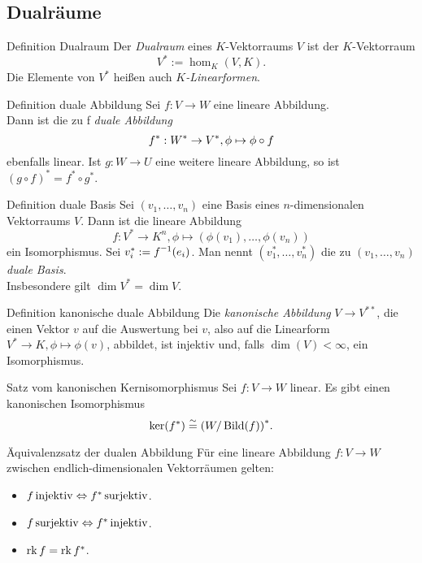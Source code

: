 \documentclass[main.tex]{subfiles}
\begin{document}
\subsection*{Dualräume}
\begin{karte}{Definition Dualraum}
    Der \textit{Dualraum} eines \(K\)-Vektorraums \(V\) ist der 
    \(K\)-Vektorraum 
    \[ V^* := \hom_K(V,K). \]
    Die Elemente von \(V^*\) heißen auch \textit{\(K\)-Linearformen}.
\end{karte}
\begin{karte}{Definition duale Abbildung}
    Sei \( f : V \rightarrow W \) eine lineare Abbildung.\\
    Dann ist die zu f \textit{duale Abbildung}
    \[ f^* : W^* \rightarrow V^*, \phi \mapsto \phi \circ f \]
    ebenfalls linear.
    Ist \(g: W \rightarrow U\) eine weitere lineare Abbildung,
    so ist \({(g \circ f)}^* = f^* \circ g^* \).    
\end{karte}
\begin{karte}{Definition duale Basis}
    Sei \( (v_1, \ldots, v_n) \) eine Basis eines 
    \(n\)-dimensionalen Vektorraums \(V\). Dann ist 
    die lineare Abbildung 
    \[ f : V^* \rightarrow K^n, 
    \phi \mapsto (\phi(v_1), \ldots, \phi(v_n)) \]
    ein Isomorphismus. Sei \( v_i^* := \inverse{f}(e_i) \). 
    Man nennt \( (v_1^*, \ldots, v_n^*) \) die zu 
    \( (v_1, \ldots, v_n) \) \textit{duale Basis}.\\
    Insbesondere gilt \( \dim V^* = \dim V \).
\end{karte}
\begin{karte}{Definition kanonische duale Abbildung}
    Die \textit{kanonische Abbildung} \( V \rightarrow V^{**} \),
    die einen Vektor \(v\) auf die Auswertung bei \(v\), also auf die 
    Linearform \( V^* \rightarrow K, \phi \mapsto \phi(v)\), abbildet,
    ist injektiv und, falls \(\dim(V) < \infty \), ein Isomorphismus.
\end{karte}
\begin{karte}{Satz vom kanonischen Kernisomorphismus}%
    Sei \( f: V \rightarrow W \) linear. Es gibt einen kanonischen 
    Isomorphismus 
    \[ \ker(f^*) \overset{\sim}{=} {(W/\operatorname{Bild}(f))}^*. \]
\end{karte}
\begin{karte}{Äquivalenzsatz der dualen Abbildung}
    Für eine lineare Abbildung \( f: V \rightarrow W \) 
    zwischen endlich-dimensionalen Vektorräumen gelten:
    \begin{itemize}
        \item \( f \operatorname{injektiv} \Leftrightarrow f^* \operatorname{surjektiv} \).
        \item \( f \operatorname{surjektiv} \Leftrightarrow f^* \operatorname{injektiv} \).
        \item \( \operatorname{rk} f = \operatorname{rk} f^* \).
    \end{itemize}
\end{karte}
\end{document}
